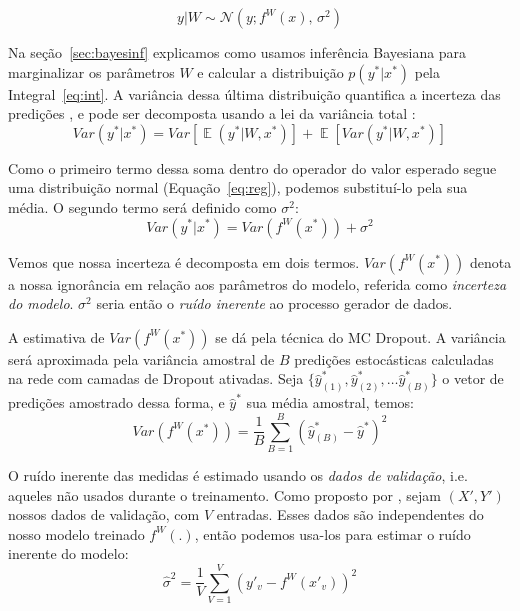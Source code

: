 \begin{equation}
  \label{eq:reg}
 y| W \sim \mathcal{N}(y;f^W(x),\,\sigma^2)
\end{equation}

 Na seção~\ref{sec:bayesinf} explicamos como usamos inferência
 Bayesiana para marginalizar os parâmetros $W$ e calcular a distribuição $p(y^*
 | x^*)$ pela Integral~\ref{eq:int}. A variância dessa última distribuição quantifica a incerteza das predições
 \citep{dropbayes}, e pode ser decomposta usando a lei da variância total \citep{ubertime}: \\



\[ Var(y^* | x^*) = Var[\mathop{\mathbb{E}}(y^* | W,x^*)] +
  \mathop{\mathbb{E}}[Var(y^* | W,x^*)] \]

Como o primeiro termo dessa soma dentro do operador do valor esperado segue uma distribuição normal
(Equação~\ref{eq:reg}), podemos substituí-lo pela sua média. O
segundo termo será definido como $\sigma^2$: \\ 
 
\[ Var(y^* | x^*) = Var(f^W(x^*)) + \sigma^2 \] 


Vemos que nossa incerteza é decomposta em dois termos. $Var(f^W(x^*))$ denota a
nossa ignorância em relação aos parâmetros do modelo, referida como
\textit{incerteza do modelo}. $\sigma^2$ seria então o \textit{ruído inerente} ao
processo gerador de dados.
 
A estimativa de $Var(f^W(x^*))$ se dá pela técnica do MC Dropout. A variância
será aproximada pela variância amostral de $B$ predições estocásticas calculadas
na rede com camadas de Dropout ativadas. Seja $\{\hat{y}^*_{(1)},\hat{y}^*_{(2)}, \dots
\hat{y}^*_{(B)}\}$ o vetor de predições amostrado dessa forma, e $\hat{y}^*$ sua
média amostral, temos: \\

\[   Var(f^W(x^*))  = \frac{1}{B}\sum^B_{B=1}(\hat{y}^*_{(B)} - \hat{y}^*)^2  \]


O ruído inerente das medidas é estimado usando os \textit{dados de validação},
i.e. aqueles não
usados durante o treinamento. Como
proposto por \citep{ubertime}, sejam $(X',Y')$ nossos dados de validação, com
$V$ entradas. Esses dados são independentes do nosso modelo
treinado $f^W(.)$, então podemos usa-los para estimar o ruído inerente do
modelo: \\

\[ \hat{\sigma}^2 = \frac{1}{V}\sum^V_{V=1}(y'_v - f^W(x'_v))^2 \]

